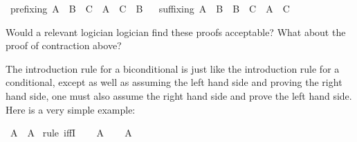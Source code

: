 \begin{isabellebody}
\begin{isamarkuptext}
\end{isamarkuptext}\isamarkuptrue%
\isamarkupfalse%
\ prefixing{\isacharcolon}\ {\isachardoublequoteopen}{\isacharparenleft}A\ {\isasymlongrightarrow}\ B{\isacharparenright}\ {\isasymlongrightarrow}\ {\isacharparenleft}C\ {\isasymlongrightarrow}\ A{\isacharparenright}\ {\isasymlongrightarrow}\ {\isacharparenleft}C\ {\isasymlongrightarrow}\ B{\isacharparenright}{\isachardoublequoteclose}%
\isadelimproof
\ %
\endisadelimproof
%
\isatagproof
{}\isamarkupfalse%
%
\endisatagproof
{\isafoldproof}%
%
\isadelimproof
%
\endisadelimproof
\isanewline
\isanewline
{}\isamarkupfalse%
\ suffixing{\isacharcolon}\ {\isachardoublequoteopen}{\isacharparenleft}A\ {\isasymlongrightarrow}\ B{\isacharparenright}\ {\isasymlongrightarrow}\ {\isacharparenleft}B\ {\isasymlongrightarrow}\ C{\isacharparenright}\ {\isasymlongrightarrow}\ {\isacharparenleft}A\ {\isasymlongrightarrow}\ C{\isacharparenright}{\isachardoublequoteclose}%
\isadelimproof
\ %
\endisadelimproof
%
\isatagproof
{}\isamarkupfalse%
%
\endisatagproof
{\isafoldproof}%
%
\isadelimproof
%
\endisadelimproof
%
\begin{isamarkuptext}%
Would a relevant logician logician find these proofs acceptable? What about the proof of
contraction above?%
\end{isamarkuptext}\isamarkuptrue%
%
\isadelimdocument
%
\endisadelimdocument
%
\isatagdocument
%
\isamarkuptrue%
%
\endisatagdocument
{\isafolddocument}%
%
\isadelimdocument
%
\endisadelimdocument
%
\begin{isamarkuptext}%
The introduction rule for a biconditional is just like the introduction rule for a
conditional, except as well as assuming the left hand side and proving the right hand side, one
must also assume the right hand side and prove the left hand side. Here is a very simple example:%
\end{isamarkuptext}\isamarkuptrue%
\isamarkupfalse%
\ {\isachardoublequoteopen}A\ {\isasymlongleftrightarrow}\ A{\isachardoublequoteclose}\isanewline
%
\isadelimproof
%
\endisadelimproof
%
\isatagproof
{}\isamarkupfalse%
\ {\isacharparenleft}rule\ iffI{\isacharparenright}\isanewline
\ \ \isamarkupfalse%
\ {\isachardoublequoteopen}A{\isachardoublequoteclose}\isanewline
\ \ \isamarkupfalse%
\ {\isachardoublequoteopen}A{\isachardoublequoteclose}\isacommand{{\isachardot}}\isamarkupfalse%
\isanewline
{}\isamarkupfalse%

\end{isabellebody}

